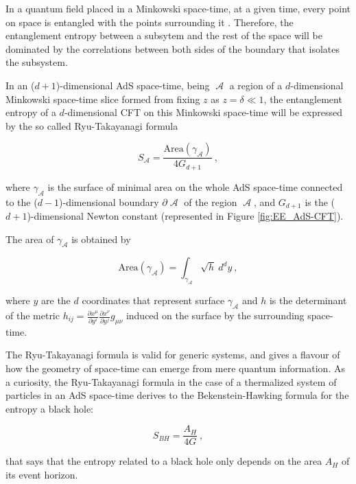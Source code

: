 \documentclass[lettersize,journal]{IEEEtran}
\providecommand{\eq}[2]{
    \begin{equation}
        #2
    \label{eq:#1}
    \end{equation}
}
\DeclareMathOperator{\calA}{\mathcal{A}}
\begin{document}
In a quantum field placed in a Minkowski space-time, at a given time, every point on space is entangled with the points surrounding it \cite{nishioka_entanglement_2018}. Therefore, the entanglement entropy between a subsytem and the rest of the space will be dominated by the correlations between both sides of the boundary that isolates the subsystem.



In an ($d+1$)-dimensional AdS space-time, being $\calA$ a region of a $d$-dimensional Minkowski space-time slice formed from fixing $z$ as $z=\delta \ll 1$, the entanglement entropy of a $d$-dimensional CFT on this Minkowski space-time will be expressed by the so called Ryu-Takayanagi formula
\eq{EE_RT}{
    S_{\calA} = \frac{ \text{Area}(\gamma_{\calA}) }{ 4 G_{d+1} } \ ,
}
\cite{ryu_holographic_2008} where $\gamma_{\calA}$ is the surface of minimal area on the whole AdS space-time connected to the ($d-1$)-dimensional boundary $\partial \calA$ of the region $\calA$, and $G_{d+1}$ is the ($d+1$)-dimensional Newton constant (represented in Figure \ref{fig:EE_AdS-CFT}).

The area of $\gamma_{\calA}$ is obtained by
\eq{EE_RT-area}{
    \text{Area}(\gamma_{\calA}) = \int_{\gamma_{\calA}} \sqrt{h} \ d^{d}y \ ,
}
where $y$ are the $d$ coordinates that represent surface $\gamma_{\calA}$ and $h$ is the determinant of the metric $h_{ij} = \frac{\partial x^\mu}{\partial y^i} \frac{\partial x^\nu}{\partial y^j} g_{\mu\nu}$ induced on the surface by the surrounding space-time.

The Ryu-Takayanagi formula is valid for generic systems, and gives a flavour of how the geometry of space-time can emerge from mere quantum information. As a curiosity, the Ryu-Takayanagi formula in the case of a thermalized system of particles in an AdS space-time derives to the Bekenstein-Hawking formula \cite{bekenstein_black_1973} for the entropy a black hole:
\eq{BH}{
    S_{BH} = \frac{ A_H }{ 4 G } \ ,
}
that says that the entropy related to a black hole only depends on the area $A_H$ of its event horizon.
\end{document}
